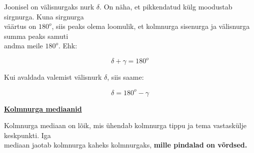 \begin{center}
{{{\begin{flushleft}
\begin{center}
\end{center}

\hspace{5mm}
Joonisel on välisnurgaks nurk $\delta$. On näha, et pikkendatud külg moodustab sirgnurga. Kuna sirgnurga\\ \hspace{5mm} väärtus on $180^{o}$, siis peaks olema loomulik, et kolmnurga sisenurga ja välisnurga summa peaks samuti\\ \hspace{5mm} andma meile $180^{o}$. Ehk:

\begin{equation}
\label{30_eq1}
\boxed{\delta + \gamma = 180^{o}}
\end{equation}

\hspace{5mm}
Kui avaldada valemist välisnurk $\delta$, siis saame:

\begin{equation}
\label{30_eq2}
\boxed{\delta=180^{o}-\gamma}
\end{equation}

\vspace{5mm}
\hspace{5mm}
\textbf{\underline{Kolmnurga mediaanid}}

\vspace{2mm}
\hspace{5mm}
Kolmnurga mediaan on lõik, mis ühendab kolmnurga tippu ja tema vastaskülje keskpunkti. Iga\\ \hspace{5mm} mediaan jaotab kolmnurga kaheks kolmnurgaks, \textbf{mille pindalad on võrdsed.}

\begin{center}
\end{center}
\end{flushleft}}}}
\end{center}
